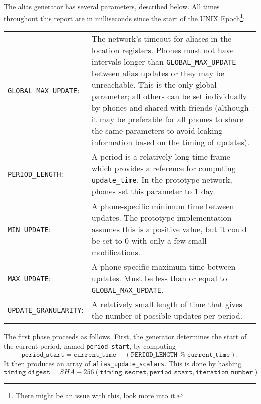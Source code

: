 \documentclass[11pt]{article}
\begin{document}
The alias generator has several parameters, described below. All times throughout this report are in milliseconds since the start of the UNIX Epoch\footnote{ There might be an issue with this, look more into it.}:

	\begin{center}
		\begin{tabular}{p{4cm} p{9cm} }
\texttt{GLOBAL_MAX_UPDATE}: &  
			The network's timeout for aliases in the location registers. Phones must not have intervals longer than \texttt{GLOBAL_MAX_UPDATE} between alias updates or they may be unreachable. This is the only global parameter; all others can be set individually by phones and shared with friends (although it may be preferable for all phones to share the same parameters to avoid leaking information based on the timing of updates). \\[0.5cm]
\texttt{PERIOD_LENGTH}: &
			A period is a relatively long time frame which provides a reference for computing \texttt{update_time}. In the prototype network, phones set this parameter to 1 day. \\[0.5cm]
\texttt{MIN_UPDATE}: &
			A phone-specific minimum time between updates. The prototype implementation assumes this is a positive value, but it could be set to 0 with only a few small modifications. \\[0.5cm]
\texttt{MAX_UPDATE}: &
			A phone-specific maximum time between updates. Must be less than or equal to \texttt{GLOBAL_MAX_UPDATE}. \\[0.5cm]
\texttt{UPDATE_GRANULARITY}: & 
	A relatively small length of time that gives the number of possible updates per period. 
\end{tabular}
\end{center}

	The first phase proceeds as follows. First, the generator determines the start of the current period, named \texttt{period_start}, by computing 
\begin{equation*}
	\texttt{period_start} = \texttt{current_time} - (\texttt{PERIOD_LENGTH}\; \% \;\texttt{current_time}). 
\end{equation*}
It then produces an array of \texttt{alias_update_scalars}. This is done by hashing 
\begin{equation*}
	\texttt{timing_digest} = SHA-256(\texttt{timing_secret}, \texttt{period_start}, \texttt{iteration_number})
\end{equation*}
\end{document}
